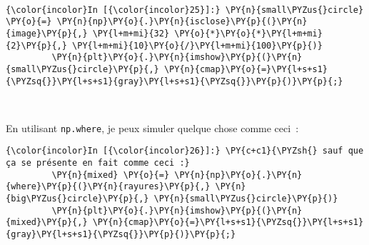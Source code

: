     \begin{center}
    \end{center}
    { \hspace*{\fill} \\}
    
    \begin{Verbatim}[commandchars=\\\{\},frame=single,framerule=0.3mm,rulecolor=\color{cellframecolor}]
{\color{incolor}In [{\color{incolor}25}]:} \PY{n}{small\PYZus{}circle} \PY{o}{=} \PY{n}{np}\PY{o}{.}\PY{n}{isclose}\PY{p}{(}\PY{n}{image}\PY{p}{,} \PY{l+m+mi}{32} \PY{o}{*}\PY{o}{*}\PY{l+m+mi}{2}\PY{p}{,} \PY{l+m+mi}{10}\PY{o}{/}\PY{l+m+mi}{100}\PY{p}{)}
         \PY{n}{plt}\PY{o}{.}\PY{n}{imshow}\PY{p}{(}\PY{n}{small\PYZus{}circle}\PY{p}{,} \PY{n}{cmap}\PY{o}{=}\PY{l+s+s1}{\PYZsq{}}\PY{l+s+s1}{gray}\PY{l+s+s1}{\PYZsq{}}\PY{p}{)}\PY{p}{;}
\end{Verbatim}


    \begin{center}
    \end{center}
    { \hspace*{\fill} \\}
    
    En utilisant \texttt{np.where}, je peux simuler quelque chose comme
ceci~:

\begin{Shaded}
\begin{Highlighting}[frame=lines,framerule=0.6mm,rulecolor=\color{asisframecolor}]
\OperatorTok{=}
\end{Highlighting}
\end{Shaded}

    \begin{Verbatim}[commandchars=\\\{\},frame=single,framerule=0.3mm,rulecolor=\color{cellframecolor}]
{\color{incolor}In [{\color{incolor}26}]:} \PY{c+c1}{\PYZsh{} sauf que ça se présente en fait comme ceci :}
         \PY{n}{mixed} \PY{o}{=} \PY{n}{np}\PY{o}{.}\PY{n}{where}\PY{p}{(}\PY{n}{rayures}\PY{p}{,} \PY{n}{big\PYZus{}circle}\PY{p}{,} \PY{n}{small\PYZus{}circle}\PY{p}{)}
         \PY{n}{plt}\PY{o}{.}\PY{n}{imshow}\PY{p}{(}\PY{n}{mixed}\PY{p}{,} \PY{n}{cmap}\PY{o}{=}\PY{l+s+s1}{\PYZsq{}}\PY{l+s+s1}{gray}\PY{l+s+s1}{\PYZsq{}}\PY{p}{)}\PY{p}{;}
\end{Verbatim}


